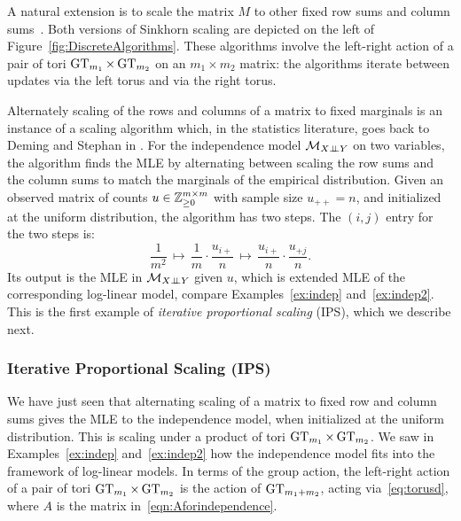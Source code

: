 A natural extension is to scale the matrix $M$ to other fixed row sums and column sums~\cite{sinkhorn1967concerning}.
Both versions of Sinkhorn scaling are depicted on the left of Figure~\ref{fig:DiscreteAlgorithms}.
These algorithms involve the left-right action of a pair of tori $\operatorname{GT}_{m_1} \times \operatorname{GT}_{m_2}$ on an $m_1 \times m_2$ matrix: the algorithms iterate between updates via the left torus and via the right torus. 

Alternately scaling of the rows and columns of a matrix to fixed marginals is an instance of a scaling algorithm which, in the statistics literature, goes back to Deming and Stephan in \cite{IPForiginal}. For the independence model $\mathcal{M}_{X {\perp\!\!\!\perp} Y}$ on two variables, the algorithm finds the MLE by alternating between scaling the row sums and the column sums to match the marginals of the empirical distribution.
Given an observed matrix of counts $u \in \mathbb Z_{\geq 0}^{m \times m}$ with sample size $u_{++} = n$, and
initialized at the uniform distribution, the algorithm has two steps. The $(i,j)$ entry for the two steps is:
\begin{equation}
	\label{eqn:IPS_two_steps}
	\frac{1}{m^2} \, \mapsto \,  \frac{1}{m} \cdot \frac{u_{i+}}{n} \, \mapsto \,   \frac{u_{i+}}{n} \cdot \frac{u_{+j}}{n}.
\end{equation} 
Its output is the MLE in $\mathcal{M}_{X {\perp\!\!\!\perp} Y}$ given $u$, which is extended MLE of the corresponding log-linear model, compare Examples~\eqref{ex:indep} and~\ref{ex:indep2}.
This is the first example of {\em iterative proportional scaling} (IPS), which we describe next.

\subsubsection*{Iterative Proportional Scaling (IPS)}

We have just seen that alternating scaling of a matrix to fixed row and column sums gives the MLE to the independence model, when initialized at the uniform distribution.
This is scaling under a product of tori $\operatorname{GT}_{m_1} \times \operatorname{GT}_{m_2}$.
We saw in Examples~\ref{ex:indep} and~\ref{ex:indep2} how the independence model fits into the framework of log-linear models. In terms of the group action, the left-right action of a pair of tori $\operatorname{GT}_{m_1} \times \operatorname{GT}_{m_2}$ is the action of $\operatorname{GT}_{m_1 + m_2}$, acting via~\eqref{eq:torusd}, where $A$ is the matrix in~\eqref{eqn:Aforindependence}.

